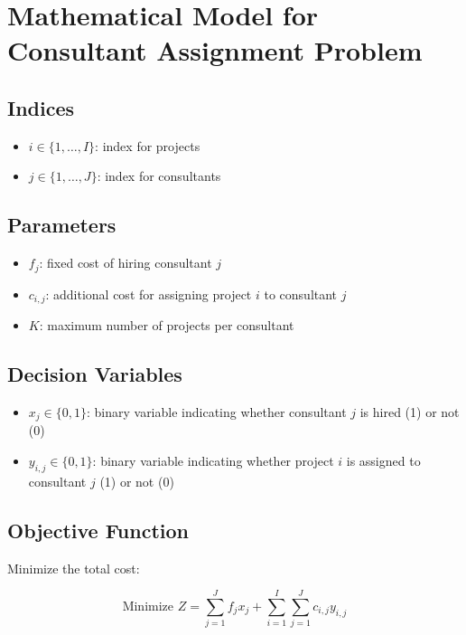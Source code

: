 \documentclass{article}
\begin{document}
\section*{Mathematical Model for Consultant Assignment Problem}

\subsection*{Indices}
\begin{itemize}
    \item $i \in \{1, \ldots, I\}$: index for projects
    \item $j \in \{1, \ldots, J\}$: index for consultants
\end{itemize}

\subsection*{Parameters}
\begin{itemize}
    \item $f_j$: fixed cost of hiring consultant $j$ 
    \item $c_{i,j}$: additional cost for assigning project $i$ to consultant $j$ 
    \item $K$: maximum number of projects per consultant
\end{itemize}

\subsection*{Decision Variables}
\begin{itemize}
    \item $x_{j} \in \{0, 1\}$: binary variable indicating whether consultant $j$ is hired (1) or not (0)
    \item $y_{i,j} \in \{0, 1\}$: binary variable indicating whether project $i$ is assigned to consultant $j$ (1) or not (0)
\end{itemize}

\subsection*{Objective Function}
Minimize the total cost:

\[
\text{Minimize } Z = \sum_{j=1}^{J} f_j x_j + \sum_{i=1}^{I} \sum_{j=1}^{J} c_{i,j} y_{i,j}
\]
\end{document}
